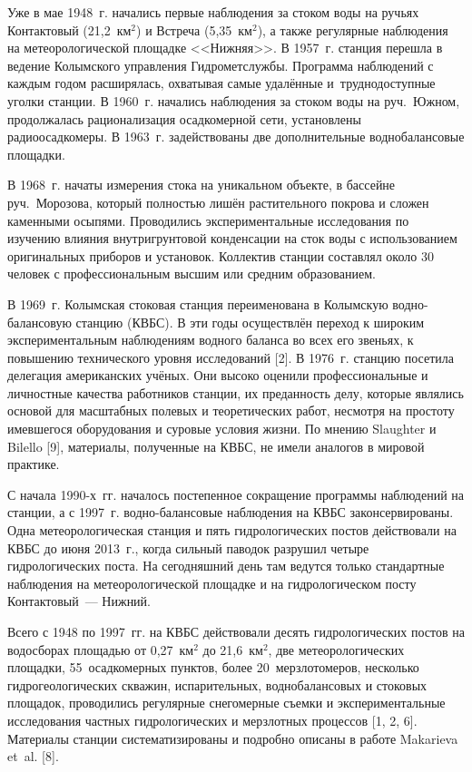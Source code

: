 Уже в мае 1948~г. начались первые наблюдения за стоком воды на ручьях Контактовый (21,2~км$^2$) и Встреча (5,35~км$^2$), а также регулярные наблюдения на метеорологической площадке <<Нижняя>>. В 1957~г. станция перешла в ведение Колымского управления Гидрометслужбы. Программа наблюдений с каждым годом расширялась, охватывая самые удалённые и~труднодоступные уголки станции. В 1960~г. начались наблюдения за стоком воды на руч.~Южном, продолжалась рационализация осадкомерной сети, установлены радиоосадкомеры. В 1963~г. задействованы две дополнительные воднобалансовые площадки.

В 1968~г. начаты измерения стока на уникальном объекте, в бассейне руч.~Морозова, который полностью лишён растительного покрова и сложен каменными осыпями. Проводились экспериментальные исследования по изучению влияния внутригрунтовой конденсации на сток воды с использованием оригинальных приборов и установок. Коллектив станции составлял около 30 человек с профессиональным высшим или средним образованием.

В 1969~г. Колымская стоковая станция переименована в Колымскую водно-балансовую станцию (КВБС). В эти годы осуществлён переход к широким экспериментальным наблюдениям водного баланса во всех его звеньях, к повышению технического уровня исследований [2]. В 1976~г. станцию посетила делегация американских учёных. Они высоко оценили профессиональные и личностные качества работников станции, их преданность делу, которые являлись основой для масштабных полевых и теоретических работ, несмотря на простоту имевшегося оборудования и суровые условия жизни. По мнению Slaughter и Bilello [9], материалы, полученные на КВБС, не имели аналогов в мировой практике.

С начала 1990-х~гг. началось постепенное сокращение программы наблюдений на станции, а с 1997~г. водно-балансовые наблюдения на КВБС законсервированы. Одна метеорологическая станция и пять гидрологических постов действовали на КВБС до июня 2013~г., когда сильный паводок разрушил четыре гидрологических поста. На сегодняшний день там ведутся только стандартные наблюдения на метеорологической площадке и на гидрологическом посту Контактовый~--- Нижний.

Всего с 1948 по 1997~гг. на КВБС действовали десять гидрологических постов на водосборах площадью от 0,27~км$^2$ до 21,6~км$^2$, две метеорологических площадки, 55~осадкомерных пунктов, более 20~мерзлотомеров, несколько гидрогеологических скважин, испарительных, воднобалансовых и стоковых площадок, проводились регулярные снегомерные съемки и экспериментальные исследования частных гидрологических и мерзлотных процессов [1, 2, 6]. Материалы станции систематизированы и подробно описаны в работе Makarieva et~al. [8].

